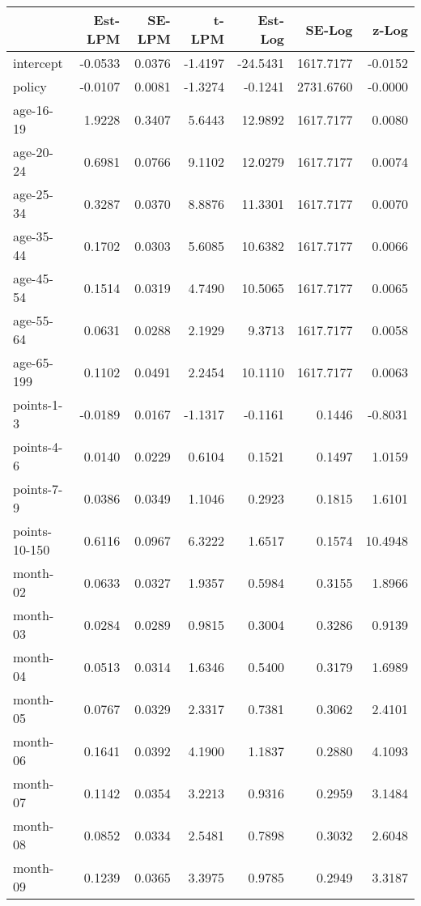 \documentclass[10pt]{article}
\begin{document}
\begin{table}[ht]
\centering
\begin{tabular}{lrrrrrr}
  \hline
 & Est-LPM & SE-LPM & t-LPM & Est-Log & SE-Log & z-Log \\ 
  \hline
intercept & -0.0533 & 0.0376 & -1.4197 & -24.5431 & 1617.7177 & -0.0152 \\ 
  policy & -0.0107 & 0.0081 & -1.3274 & -0.1241 & 2731.6760 & -0.0000 \\ 
  age-16-19 & 1.9228 & 0.3407 & 5.6443 & 12.9892 & 1617.7177 & 0.0080 \\ 
  age-20-24 & 0.6981 & 0.0766 & 9.1102 & 12.0279 & 1617.7177 & 0.0074 \\ 
  age-25-34 & 0.3287 & 0.0370 & 8.8876 & 11.3301 & 1617.7177 & 0.0070 \\ 
  age-35-44 & 0.1702 & 0.0303 & 5.6085 & 10.6382 & 1617.7177 & 0.0066 \\ 
  age-45-54 & 0.1514 & 0.0319 & 4.7490 & 10.5065 & 1617.7177 & 0.0065 \\ 
  age-55-64 & 0.0631 & 0.0288 & 2.1929 & 9.3713 & 1617.7177 & 0.0058 \\ 
  age-65-199 & 0.1102 & 0.0491 & 2.2454 & 10.1110 & 1617.7177 & 0.0063 \\ 
  points-1-3 & -0.0189 & 0.0167 & -1.1317 & -0.1161 & 0.1446 & -0.8031 \\ 
  points-4-6 & 0.0140 & 0.0229 & 0.6104 & 0.1521 & 0.1497 & 1.0159 \\ 
  points-7-9 & 0.0386 & 0.0349 & 1.1046 & 0.2923 & 0.1815 & 1.6101 \\ 
  points-10-150 & 0.6116 & 0.0967 & 6.3222 & 1.6517 & 0.1574 & 10.4948 \\ 
  month-02 & 0.0633 & 0.0327 & 1.9357 & 0.5984 & 0.3155 & 1.8966 \\ 
  month-03 & 0.0284 & 0.0289 & 0.9815 & 0.3004 & 0.3286 & 0.9139 \\ 
  month-04 & 0.0513 & 0.0314 & 1.6346 & 0.5400 & 0.3179 & 1.6989 \\ 
  month-05 & 0.0767 & 0.0329 & 2.3317 & 0.7381 & 0.3062 & 2.4101 \\ 
  month-06 & 0.1641 & 0.0392 & 4.1900 & 1.1837 & 0.2880 & 4.1093 \\ 
  month-07 & 0.1142 & 0.0354 & 3.2213 & 0.9316 & 0.2959 & 3.1484 \\ 
  month-08 & 0.0852 & 0.0334 & 2.5481 & 0.7898 & 0.3032 & 2.6048 \\ 
  month-09 & 0.1239 & 0.0365 & 3.3975 & 0.9785 & 0.2949 & 3.3187 \\ 

\end{tabular}
\end{table}
\end{document}
